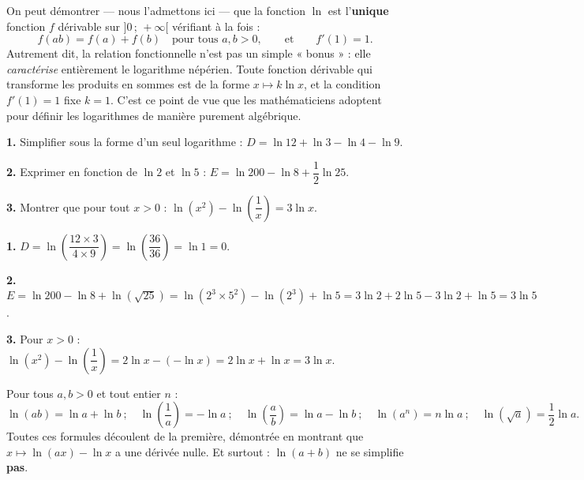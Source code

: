 \documentclass[11pt]{article}
\begin{document}
\begin{savaistu}
On peut démontrer — nous l'admettons ici — que la fonction $\ln$ est l'\textbf{unique} fonction $f$ dérivable sur $]0\,;\,+\infty[$ vérifiant à la fois :
\[
f(ab) = f(a) + f(b) \quad \text{pour tous } a, b > 0, \qquad \text{et} \qquad f'(1) = 1.
\]
Autrement dit, la relation fonctionnelle n'est pas un simple « bonus » : elle \emph{caractérise} entièrement le logarithme népérien. Toute fonction dérivable qui transforme les produits en sommes est de la forme $x \mapsto k\ln x$, et la condition $f'(1) = 1$ fixe $k = 1$. C'est ce point de vue que les mathématiciens adoptent pour définir les logarithmes de manière purement algébrique.
\end{savaistu}

\begin{exercice}
\textbf{1.} Simplifier sous la forme d'un seul logarithme : $D = \ln 12 + \ln 3 - \ln 4 - \ln 9$.

\textbf{2.} Exprimer en fonction de $\ln 2$ et $\ln 5$ : $E = \ln 200 - \ln 8 + \dfrac{1}{2}\ln 25$.

\textbf{3.} Montrer que pour tout $x > 0$ : $\ln\left(x^2\right) - \ln\left(\dfrac{1}{x}\right) = 3\ln x$.
\end{exercice}

\begin{corrige}[Exercice]
\textbf{1.} $D = \ln\left(\dfrac{12 \times 3}{4 \times 9}\right) = \ln\left(\dfrac{36}{36}\right) = \ln 1 = 0$.

\textbf{2.} $E = \ln 200 - \ln 8 + \ln(\sqrt{25}) = \ln(2^3 \times 5^2) - \ln(2^3) + \ln 5 = 3\ln 2 + 2\ln 5 - 3\ln 2 + \ln 5 = 3\ln 5$.

\textbf{3.} Pour $x > 0$ : $\ln(x^2) - \ln\left(\dfrac{1}{x}\right) = 2\ln x - (-\ln x) = 2\ln x + \ln x = 3\ln x$.
\end{corrige}

\begin{aretenir}
Pour tous $a, b > 0$ et tout entier $n$ :
\[
\ln(ab) = \ln a + \ln b \ ; \quad \ln\left(\frac{1}{a}\right) = -\ln a \ ; \quad \ln\left(\frac{a}{b}\right) = \ln a - \ln b \ ; \quad \ln(a^n) = n\ln a \ ; \quad \ln(\sqrt{a}) = \frac{1}{2}\ln a.
\]
Toutes ces formules découlent de la première, démontrée en montrant que $x \mapsto \ln(ax) - \ln x$ a une dérivée nulle. Et surtout : $\ln(a+b)$ ne se simplifie \textbf{pas}.
\end{aretenir}
\end{document}
